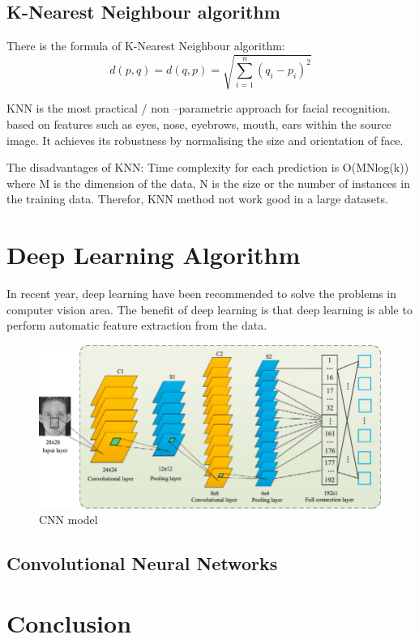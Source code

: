 \documentclass[10pt,twocolumn,letterpaper]{article}
\begin{document}
\subsection{K-Nearest Neighbour algorithm} There is the formula of K-Nearest Neighbour algorithm:
\begin{equation}
  d(p,q) = d(q,p) = \sqrt{\sum_{i=1}^{n} (q_i - p_i)^{2}}
 \end{equation}
 
KNN is the most practical / non –parametric approach for facial recognition. ~\cite{knn}
based on features such as eyes, nose, eyebrows, mouth, ears within the source image. 
It achieves its robustness by normalising the size and orientation of face. ~\cite{4}

The disadvantages of KNN: 
Time complexity for each prediction is O(MNlog(k)) where M is the dimension of the data, N is the size or the number of instances in the training data.
Therefor, KNN method not work good in a large datasets.



\section{Deep Learning Algorithm}
In recent year, deep learning have been recommended to solve the problems in computer vision area.
The benefit of deep learning is that deep learning is able to perform automatic feature extraction from the data.

\begin{figure}[htb]
  \centering
   \includegraphics[width=0.9\linewidth]{CNN.png}

   \caption{CNN model ~\cite{cnn}}
\end{figure}


\subsection{Convolutional Neural Networks}



\section{Conclusion}






{\small


}
\end{document}
